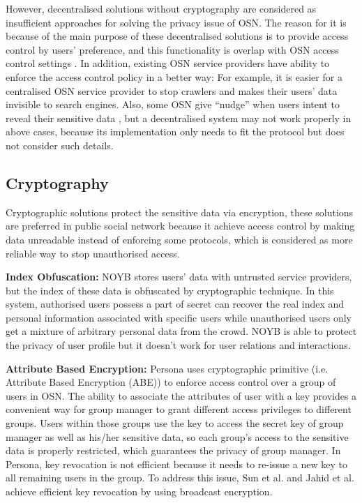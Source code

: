 However, decentralised solutions without cryptography are considered as insufficient approaches for solving the privacy issue of OSN. The reason for it is because of the main purpose of these decentralised solutions is to provide access control by users' preference, and this functionality is overlap with OSN access control settings \cite{narayanan2012critical}. In addition, existing OSN service providers have ability to enforce the access control policy in a better way: For example, it is easier for a centralised OSN service provider to stop crawlers and makes their users' data invisible to search engines. Also, some OSN give ``nudge''  when users intent to reveal their sensitive data \cite{mori2010nudge}, but a decentralised system may not work properly in above cases, because its implementation only needs to fit the protocol but does not consider such details.

\subsection{Cryptography}
Cryptographic solutions protect the sensitive data via encryption, these solutions are preferred in public social network because it achieve access control by making data unreadable instead of enforcing some protocols, which is considered as more reliable way to stop unauthorised access.

{\bf Index Obfuscation:} NOYB \cite{guha2008noyb} stores users' data with untrusted service providers, but the index of these data is obfuscated by cryptographic technique. In this system, authorised users possess a part of secret can recover the real index and personal information associated with specific users while unauthorised users only get a mixture of arbitrary personal data from the crowd. NOYB is able to protect the privacy of user profile but it doesn't work for user relations and interactions. 

{\bf Attribute Based Encryption:} Persona \cite{baden2009persona} uses cryptographic primitive (i.e. Attribute Based Encryption (ABE)) to enforce access control over a group of users in OSN. The ability to associate the attributes of user with a key provides a convenient way for group manager to grant different access privileges to different groups. Users within those groups use the key to access the secret key of group manager as well as his/her sensitive data, so each group's access to the sensitive data is properly restricted, which guarantees the privacy of group manager. 
In Persona, key revocation is not efficient because it needs to re-issue a new key to all remaining users in the group. To address this issue, Sun et al. \cite{sun2010privacy} and Jahid et al. \cite{jahid2011easier} achieve efficient key revocation by using broadcast encryption.

